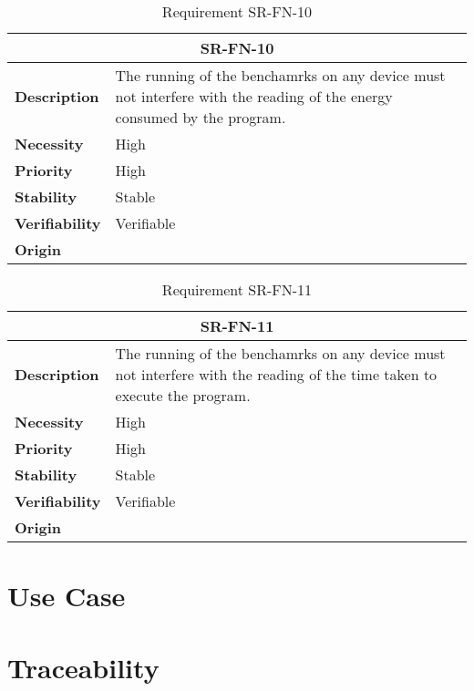 \begin{table}[H]
    \centering
    \begin{tabular}{l p{10cm}}
        \toprule
        \multicolumn{2}{c}{SR-FN-10} \\
        \toprule
        \textbf{Description}        &  The running of the benchamrks on any device must not interfere with the reading of the energy consumed by the program. \\
        \textbf{Necessity}          &  High \\
        \textbf{Priority}           &  High \\
        \textbf{Stability}          &  Stable \\
        \textbf{Verifiability}      & Verifiable \\
        \textbf{Origin}             & \textit{\nameref{tab:ur-ca-09}} \\
    \end{tabular}
    \caption{Requirement SR-FN-10}
    \label{tab:sr-fn-10}
\end{table}

\begin{table}[H]
    \centering
    \begin{tabular}{l p{10cm}}
        \toprule
        \multicolumn{2}{c}{SR-FN-11} \\
        \toprule
        \textbf{Description}        &  The running of the benchamrks on any device must not interfere with the reading of the time taken to execute the program. \\
        \textbf{Necessity}          &  High \\
        \textbf{Priority}           &  High \\
        \textbf{Stability}          &  Stable \\
        \textbf{Verifiability}      & Verifiable \\
        \textbf{Origin}             & \textit{\nameref{tab:ur-ca-09}} \\
    \end{tabular}
    \caption{Requirement SR-FN-11}
    \label{tab:sr-fn-11}
\end{table}

\section{Use Case}
\checkmark





\section{Traceability}
